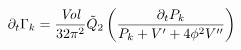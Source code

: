\begin{equation}
\partial_t\Gamma_k=
{\mathit{Vol}\over 32\pi^2}\tilde Q_2\left({\partial_tP_k\over
P_k+V'+4\phi^2V''}\right)
\end{equation}

